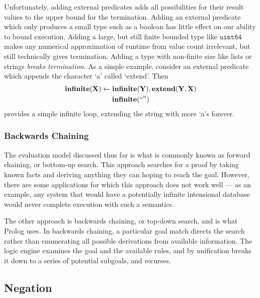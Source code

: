 Unfortunately, adding external predicates adds all possibilities for their result values to the upper bound for the termination.
Adding an external predicate which only produces a small type such as a boolean has little effect on our ability to bound execution.
Adding a large, but still finite bounded type like $\texttt{uint64}$ makes any numerical approximation of runtime from value count irrelevant, but still technically gives termination.
Adding a type with non-finite size like lists or strings \emph{breaks termination}.
As a simple example, consider an external predicate which appends the character `a' called `extend'. Then
\begin{gather*}
  {\bf infinite}({\bf X}) \leftarrow {\bf infinite}({\bf Y}), {\bf extend}({\bf Y}, {\bf X})\\
  {\bf infinite}(``'')
\end{gather*}
provides a simple infinite loop, extending the string with more `a's forever.

\subsubsection{Backwards Chaining}
\label{sec:bchain}
The evaluation model discussed thus far is what is commonly known as forward chaining, or bottom-up search.
This approach searches for a proof by taking known facts and deriving anything they can hoping to reach the goal.
However, there are some applications for which this approach does not work well --- as an example, any system that would have a potentially infinite intensional database would never complete execution with such a semantics.

The other approach is backwards chaining, or top-down search, and is what Prolog uses.
In backwards chaining, a particular goal match directs the search rather than enumerating all possible derivations from available information.
The logic engine examines the goal and the available rules, and by unification breaks it down to a series of potential subgoals, and recurses.

\subsection{Negation}
